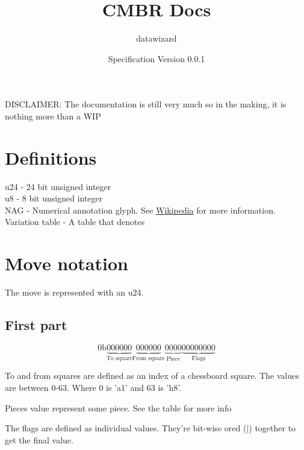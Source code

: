 \documentclass{article}
\title{CMBR Docs}
\author{datawizard}
\date{Specification Version 0.0.1}
\begin{document}
\maketitle

DISCLAIMER: The documentation is still very much so in the making, it is nothing more than a WIP

\section{Definitions}
u24 - 24 bit unsigned integer \\
u8  - 8  bit unsigned integer \\
NAG - Numerical annotation glyph. See \href{https://w.wiki/AWUT}{Wikipedia} for more information. \\
Variation table - A table that denotes  \\

\section{Move notation}
The move is represented with an u24.
\subsection{First part}
\begin{equation}
    0\text{b}\underbrace{000000}_\text{To square} \underbrace{000000}_\text{From square}
    \underbrace{0000}_\text{Piece}\underbrace{00000000}_\text{Flags}
\end{equation}

To and from squares are defined as an index of a chessboard square. The values are between 0-63. Where 0 is 'a1' and 63 is 'h8'.
\par Pieces value represent some piece. See the table for more info
\par The flags are defined as individual values. They're bit-wise ored ($\vert$) together to get the final value.
\end{document}
